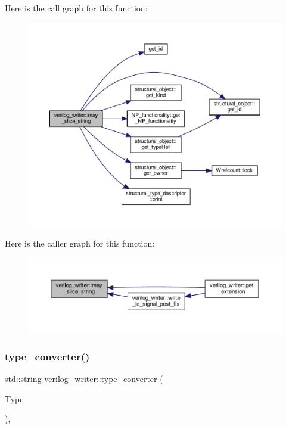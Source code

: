 Here is the call graph for this function\+:
\nopagebreak
\begin{figure}[H]
\begin{center}
\leavevmode
\includegraphics[width=350pt]{d8/dba/classverilog__writer_a0dc813bd5493e6c2fd53c99d720eb958_cgraph}
\end{center}
\end{figure}
Here is the caller graph for this function\+:
\nopagebreak
\begin{figure}[H]
\begin{center}
\leavevmode
\includegraphics[width=350pt]{d8/dba/classverilog__writer_a0dc813bd5493e6c2fd53c99d720eb958_icgraph}
\end{center}
\end{figure}
\mbox{\label{classverilog__writer_a20595dc1f543de374aeb4ec2f577971d}} 
\subsubsection{\texorpdfstring{type\+\_\+converter()}{type\_converter()}}
{\footnotesize\ttfamily std\+::string verilog\+\_\+writer\+::type\+\_\+converter (\begin{DoxyParamCaption}\item[{\hyperlink{structural__objects_8hpp_a219296792577e3292783725961506c83}{structural\+\_\+type\+\_\+descriptor\+Ref}}]{Type }\end{DoxyParamCaption})\hspace{0.3cm}{\ttfamily [override]}, {\ttfamily [virtual]}}



